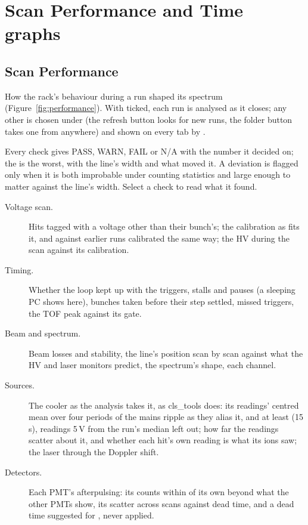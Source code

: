 \section{Scan Performance and Time graphs}
\label{sec:performance}

\subsection{Scan Performance}

How the rack's behaviour during a run shaped its spectrum (Figure~\ref{fig:performance}).
With  ticked, each run is analysed as it closes; any other
is chosen under  (the refresh button looks for new runs, the folder button
takes one from anywhere) and shown on every tab by .

Every check gives PASS, WARN, FAIL or N/A with the number it decided on; the
 is the worst, with the line's width and what moved it. A deviation is flagged
only when it is both improbable under counting statistics and large enough to matter
against the line's width. Select a check to read what it found.

\begin{description}
    \item[Voltage scan.] Hits tagged with a voltage other than their bunch's; the
        calibration as \denis{} fits it, and against earlier runs calibrated the same way;
        the HV during the scan against its calibration.
    \item[Timing.] Whether the loop kept up with the triggers, stalls and pauses (a sleeping
        PC shows here), bunches taken before their step settled, missed triggers, the TOF
        peak against its gate.
    \item[Beam and spectrum.] Beam losses and stability, the line's position scan by scan
        against what the HV and laser monitors predict, the spectrum's shape, each channel.
    \item[Sources.] The cooler as the analysis takes it, as cls\_tools does: its readings'
        centred mean over four periods of the mains ripple as they alias it, and at least
         (15\,s), readings 5\,V from the run's median left out;
        how far the readings scatter about it, and
        whether each hit's own reading is what its ions saw; the laser through the Doppler
        shift.
    \item[Detectors.] Each PMT's afterpulsing: its counts within  of
        its own beyond what the other PMTs show, its scatter across scans against dead
        time, and a dead time suggested for \denis{}, never applied.
\end{description}

